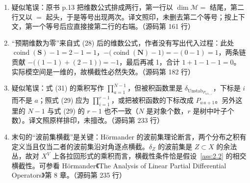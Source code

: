 \begin{enumerate}
  \item 疑似笔误：原书 p.13 把维数公式排成两行，第一行以 $\dim\mathcal M=$ 结尾，第二行又以 $=$ 起头，于是等号出现两次。译文照印，未删去第二个等号；按上下文，第一个等号后应直接接第二行的右端。\hfill{\footnotesize （源码第 161 行）}
  \item “预期维数为零”来自式 (28) 后的维数公式，作者没有写出代入过程：此处 $\operatorname{coind}(\mathbf S)-1=2-1=1$，$-\bigl(\operatorname{coind}(\mathbf N)-1\bigr)=-(0-1)=1$，两条链贡献 $-\bigl((1-1)+(2-1)\bigr)=-1$，最后再减 1，合计 $1+1-1-1=0$。实际模空间是一维的，故横截性必然失效。\hfill{\footnotesize （源码第 182 行）}
  \item 疑似笔误：式 (31) 的乘积写作 $\prod_{a=1}^{N-1}$，但被积函数里是 $\delta_{\mathrm{Unstab}_{P_{a_ia_{i+1}}}}$，下标是 $i$ 而不是 $a$；照式 (29) 应为 $\prod_{i=1}^{r-1}$，或把被积函数的下标改成 $P_{a\,a+1}$。另外这里的 $N-1$ 与式 (29) 的 $r-1$ 也不一致（$N$ 是对象个数，$r$ 是树中叶子个数）。译文照原样排印，未擅改。\hfill{\footnotesize （源码第 233 行）}
  \item 末句的“波前集横截”是关键：Hörmander 的波前集理论断言，两个分布之积有定义当且仅当二者的波前集沿对角逐点横截。$\delta_Z$ 的波前集是 $Z\subset X$ 的余法丛，故对 $X^V$ 上各拉回形式的乘积而言，横截性条件恰是假设~\ref{ass:2.2} 的相交横截性。可参看 Hörmander《The Analysis of Linear Partial Differential Operators》第 8 章。\hfill{\footnotesize （源码第 235 行）}
\end{enumerate}

